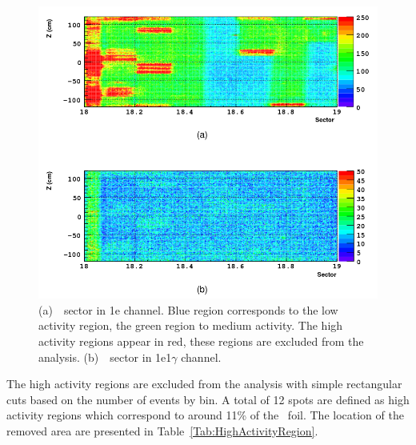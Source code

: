 \documentclass[main.tex]{subfiles}
\begin{document}
\begin{figure}[h!]
\centering
\includegraphics[scale=0.40]{pictures/Chap6/CdSector-1e-1e1g.png}
\caption{(a)~\Cd~sector in 1e channel. Blue region corresponds to the low activity region, the green region to medium activity. The high activity regions appear in red, these regions are excluded from the analysis. (b)~\Cd~sector in 1e1$\gamma$ channel.}
\label{CdSector1eChannel}
\end{figure}


\bigskip


\NI The high activity regions are excluded from the analysis with simple rectangular cuts based on the number of events by bin. A total of 12 spots are defined as high activity regions which correspond to around 11\% of the \Cd~foil. The location of the removed area are presented in Table~\ref{Tab:HighActivityRegion}. 
\end{document}
